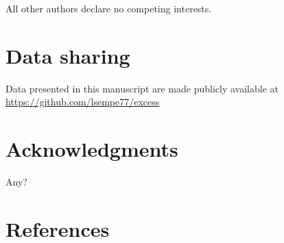 \documentclass[
]{article}
\begin{document}
All other authors declare no competing interests.

\hypertarget{data-sharing}{%
\section{Data sharing}\label{data-sharing}}

Data presented in this manuscript are made publicly available at \url{https://github.com/lsempe77/excess}

\hypertarget{acknowledgments}{%
\section{Acknowledgments}\label{acknowledgments}}

Any?

\hypertarget{references}{%
\section{References}\label{references}}
\end{document}
